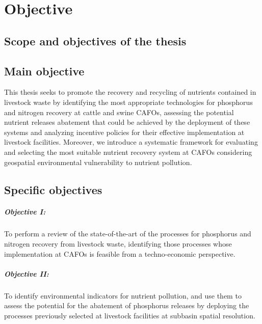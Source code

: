 \chapter{Objective}\label{ch:objectives}

\section{Scope and objectives of the thesis}
\section{Main objective}
This thesis seeks to promote the recovery and recycling of nutrients contained in livestock waste by identifying the most appropriate technologies for phosphorus and nitrogen recovery at cattle and swine CAFOs, assessing the potential nutrient releases abatement that could be achieved by the deployment of these systems and analyzing incentive policies for their effective implementation at livestock facilities. Moreover, we introduce a systematic framework for evaluating and selecting the most suitable nutrient recovery system at CAFOs considering geospatial environmental vulnerability to nutrient pollution. 

\section{Specific objectives}
\paragraph{Objective I:} To perform a review of the state-of-the-art of the processes for phosphorus and nitrogen recovery from livestock waste, identifying those processes whose implementation at CAFOs is feasible from a techno-economic perspective.
\paragraph{Objective II:} To identify environmental indicators for nutrient pollution, and use  them to  assess the potential for the abatement of phosphorus releases by deploying the processes previously selected at livestock facilities at subbasin spatial resolution.
